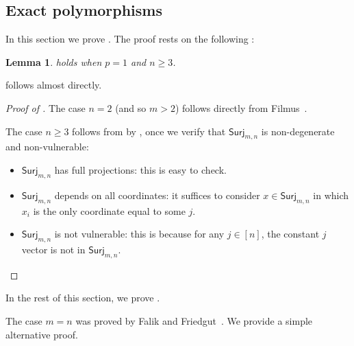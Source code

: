 \documentclass{article}
\providecommand{\Surj}{\mathsf{Surj}}
\newtheorem{lemma}[theorem]{Lemma}
\theoremstyle{definition}
\theoremstyle{remark}
\begin{document}
\subsection{Exact polymorphisms}
\label{sec:classification-exact}

In this section we prove . The proof rests on the following :

\begin{lemma} \label{lem:surj-polymorphisms-1}
 holds when $p = 1$ and $n \ge 3$.
\end{lemma}

 follows almost directly.

\begin{proof}[Proof of ]
The case $n = 2$ (and so $m > 2$) follows directly from Filmus~\cite[Theorem 1.5]{Filmus26}.

The case $n \ge 3$ follows from  by , once we verify that $\Surj_{m,n}$ is non-degenerate and non-vulnerable:
\begin{itemize}
\item $\Surj_{m,n}$ has full projections: this is easy to check.
\item $\Surj_{m,n}$ depends on all coordinates: it suffices to consider $x \in \Surj_{m,n}$ in which $x_i$ is the only coordinate equal to some $j$.
\item $\Surj_{m,n}$ is not vulnerable: this is because for any $j \in [n]$, the constant $j$ vector is not in $\Surj_{m,n}$. \qedhere
\end{itemize}
\end{proof}

In the rest of this section, we prove .

The case $m = n$ was proved by Falik and Friedgut~\cite{FalikFriedgut}. We provide a simple alternative proof.
\end{document}
